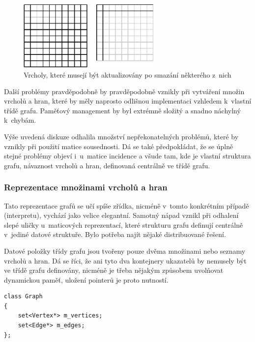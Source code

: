 \documentclass[11pt,twoside,a4paper]{book}
\begin{document}
\begin{figure}[ht]
\begin{center}
\includegraphics[width=7cm]{img/update_indices.pdf}
\caption{Vrcholy, které musejí být aktualizovány po smazání některého z~nich}
\label{fig:update_indices}
\end{center}
\end{figure}

Další problémy pravděpodobně by pravděpodobně vznikly při vytváření množin vrcholů a hran, které by měly naprosto odlišnou implementaci vzhledem k~vlastní třídě grafu. Paměťový management by byl extrémně složitý a snadno náchylný k~chybám.

Výše uvedená diskuze odhalila množství nepřekonatelných problémů, které by vznikly při použití matice sousednosti. Dá se také předpokládat, že se úplně stejné problémy objeví i~u~matice incidence a všude tam, kde je vlastní struktura grafu, návaznost vrcholů a hran, definovaná centrálně ve třídě grafu.


\subsubsection{Reprezentace množinami vrcholů a hran}
\label{reprezentace_mnozinami_vrcholu_a_hran}

Tato reprezentace grafů se učí spíše zřídka, nicméně v~tomto konkrétním případě (interpretu), vychází jako velice elegantní. Samotný nápad vznikl při odhalení slepé uličky u~maticových reprezentací, které strukturu grafu definují centrálně v~jediné datové struktuře. Bylo potřeba najít nějaké distribuované řešení.

Datové položky třídy grafu jsou tvořeny pouze dvěma množinami nebo seznamy vrcholů a hran. Dá se říci, že ani tyto dva kontejnery ukazatelů by nemusely být ve třídě grafu definovány, nicméně je třeba nějakým způsobem uvolňovat dynamickou paměť, uložení pointerů je proto nutností.

\begin{verbatim}
class Graph
{
    set<Vertex*> m_vertices;
    set<Edge*> m_edges;
};
\end{verbatim}
\end{document}

